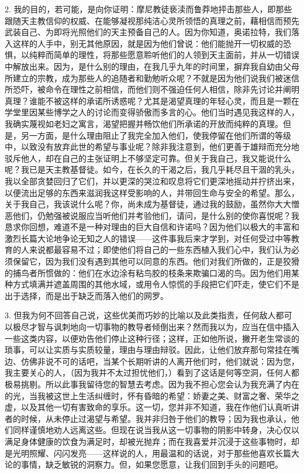 2. 我的目的，若可能，是向你证明：摩尼教徒亵渎而鲁莽地抨击那些人，即那些跟随天主教信仰的权威、在能够凝视那纯洁心灵所领悟的真理之前，藉相信而预先武装自己、为即将光照他们的天主预备自己的人。因为你知道，奥诺拉特，我们落入这样的人手中，别无其他原因，就是因为他们曾说：他们能抛开一切权威的恐惧，以纯粹而简单的理性，将那些愿意聆听他们的人领到天主面前，并从一切错误中解放出来。因为，是什么别的理由，在我几乎九年的时间里，摒弃我自幼由父母所建立的宗教，成为那些人的追随者和勤勉听众呢？不就是因为他们说我们被迷信所恐吓，被命令在理性之前相信，而他们则不强迫任何人相信，除非先讨论并阐明真理？谁能不被这样的承诺所诱惑呢？尤其是渴望真理的年轻心灵，而且是一颗在学堂里因某些博学之人的讨论而变得骄傲而多言的心。他们当时遇见我这样的人，我确实蔑视如老妇之寓言，渴望把握并畅饮他们所承诺的开放而纯粹的真理。但是，另一方面，是什么理由阻止了我完全加入他们，使我停留在他们所谓的等级中，以致没有放弃此世的希望与事业呢？除非我注意到，他们更善于雄辩而充分地驳斥他人，却在自己的主张证明上不够坚定可靠。但关于我自己，我又能说什么呢？我已是天主教基督徒。如今，在长久的干渴之后，我几乎耗尽且干涸的乳头，我以全部贪婪回归了它们，并以更深的哭泣和叹息将它们更深地摇动并拧挤出来，以便流出足够的东西来滋润我这样受影响的人，并带回生命与安全的希望。那么，关于我自己，我该说什么呢？你，尚未成为基督徒，通过我的鼓励，虽然你大大憎恶他们，仍勉强被说服应当听他们并考验他们，请问，是什么别的使你喜悦呢？我恳求你回想，难道不是一种对理由的巨大自信和许诺吗？因为他们以极大的丰富和激烈长篇大论地争论无知之人的错误——这件事我后来才学到，对任何受过中等教育的人来说都最容易不过；即使他们将自己的一些东西植入我们心中，我们认为必须保留它，因为我们没有遇到其他可以同意的东西。他们对我们所做的，正是狡猾的捕鸟者所惯做的：他们在水边涂有粘鸟胶的枝条来欺骗口渴的鸟。因为他们用某种方式填满并遮盖周围的其他水域，或用令人惊慌的手段把它们吓走，使它们不是出于选择，而是出于缺乏而落入他们的网罗。\par

3. 但我为何不回答自己说，这些优美而巧妙的比喻以及此类指责，任何敌人都可以极尽才智与讽刺地向一切事物的教导者倾倒出来？然而我以为，应当在信中插入一些这类内容，以便劝告他们停止这种行径；这样，正如他所说，撇开老生常谈的琐事，可以让实质与实质较量，理由与理由辩驳。因此，让他们放弃那句常挂在嘴边、仿佛非说不可的话吧，当某个长期听讲的人离开他们时，他们就说：因为您，我主要关心的人，（因为我并不太过担忧他们，）看到了这话是何等空洞，任何人都极易挑剔。所以此事我留待您的智慧去考虑。因为我不担心您会认为我充满了内在的光，当我被这世上生活纠缠时，怀有昏暗的希望：娇妻之美、财富之奢、荣华之虚，以及其他一切有害致命的享乐。这一切，您并非不知道，我在作他们认真听讲者的时候，从未停止过渴望与希望。我并非归咎于他们的教导；因为我也承认，他们同样谨慎地劝人远离这些。但现在说当我从这一切事物的阴影中转身，决心仅以满足身体健康的饮食为满足时，却被光抛弃；而在我喜爱并沉浸于这些事物时，却是光明照耀、闪闪发亮——这样说的人，用最温和的话说，对于那些他喜欢长篇大论的事情，缺乏敏锐的洞察力。但，如果您愿意，让我们回到手头的问题吧。\par

